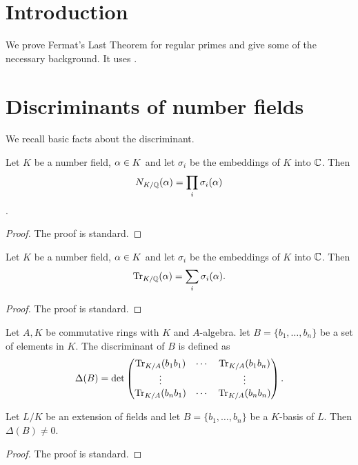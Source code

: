 	\maketitle
\tableofcontents
\section{Introduction}
We prove Fermat's Last Theorem for regular primes and give some of the necessary background. It uses \cite{Samuel,marcus,washington}.

\section{Discriminants of number fields}
We recall basic facts about the discriminant.

\begin{lemma}\label{lemma:alt_definition_of_norm}
    \leanok
	Let $K$ be a number field, $\alpha \in K$ and let $\sigma_i$ be the embeddings of $K$ into $\mathbb{C}$. Then \[N_{K/\mathbb{Q}}(\alpha)=\prod_i \sigma_i(\alpha)  \].
\end{lemma}
\begin{proof}
  \leanok
  The proof is standard.
\end{proof}

\begin{lemma}\label{lemma:alt_definition_of_trace}
	\leanok
Let $K$ be a number field, $\alpha \in K$ and let $\sigma_i$ be the embeddings of $K$ into $\mathbb{C}$. Then \[\operatorname{Tr}_{K/\mathbb{Q}}(\alpha) =\sum_i \sigma_i(\alpha). \]
\end{lemma}
\begin{proof}
\leanok
The proof is standard.
\end{proof}

\begin{definition}\label{defn_of_disc}
	\leanok
	Let $A,K$ be commutative rings with $K$ and $A$-algebra. let $B=\{b_1,\dots,b_n\}$ be a set of elements in $K$. The discriminant of $B$ is defined as \[\Delta(B)=  \det \left (\begin{matrix} \operatorname{Tr}_{K/A}(b_1b_1) &\cdots& \operatorname{Tr}_{K/A}(b_1b_n)\\ \vdots & & \vdots \\  \operatorname{Tr}_{K/A}(b_nb_1) &\cdots& \operatorname{Tr}_{K/A}(b_nb_n)
	\end{matrix} \right ).\]
\end{definition}

\begin{lemma}\label{lem:lin_indep_iff_disc_ne_zero}
    \leanok
	Let $L/K$ be an extension of fields and let $B=\{b_1,\dots,b_n\}$ be a $K$-basis of $L$. Then $\Delta(B) \neq 0$.
\end{lemma}
\begin{proof}
  \leanok
  The proof is standard.
\end{proof}

